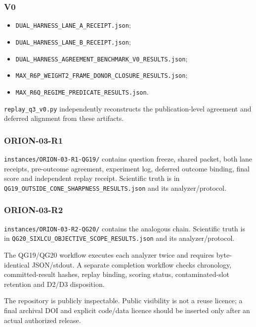 \documentclass[10pt]{article}
\providecommand{\tightlist}{%
  \setlength{\itemsep}{0pt}\setlength{\parskip}{0pt}}
\begin{document}
\hypertarget{v0}{%
\subsubsection{V0}\label{v0}}

\begin{itemize}
\tightlist
\item
  \texttt{DUAL\_HARNESS\_LANE\_A\_RECEIPT.json};
\item
  \texttt{DUAL\_HARNESS\_LANE\_B\_RECEIPT.json};
\item
  \texttt{DUAL\_HARNESS\_AGREEMENT\_BENCHMARK\_V0\_RESULTS.json};
\item
  \texttt{MAX\_R6P\_WEIGHT2\_FRAME\_DONOR\_CLOSURE\_RESULTS.json};
\item
  \texttt{MAX\_R6Q\_REGIME\_PREDICATE\_RESULTS.json}.
\end{itemize}

\texttt{replay\_q3\_v0.py} independently reconstructs the
publication-level agreement and deferred alignment from these artifacts.

\hypertarget{orion-03-r1}{%
\subsubsection{ORION-03-R1}\label{orion-03-r1}}

\texttt{instances/ORION-03-R1-QG19/} contains question freeze, shared
packet, both lane receipts, pre-outcome agreement, experiment log,
deferred outcome binding, final score and independent replay receipt.
Scientific truth is in
\texttt{QG19\_OUTSIDE\_CONE\_SHARPNESS\_RESULTS.json} and its
analyzer/protocol.

\hypertarget{orion-03-r2}{%
\subsubsection{ORION-03-R2}\label{orion-03-r2}}

\texttt{instances/ORION-03-R2-QG20/} contains the analogous chain.
Scientific truth is in
\texttt{QG20\_SIXLCU\_OBJECTIVE\_SCOPE\_RESULTS.json} and its
analyzer/protocol.

The QG19/QG20 workflow executes each analyzer twice and requires
byte-identical JSON/stdout. A separate completion workflow checks
chronology, committed-result hashes, replay binding, scoring status,
contaminated-slot retention and D2/D3 disposition.

The repository is publicly inspectable. Public visibility is not a reuse
licence; a final archival DOI and explicit code/data licence should be
inserted only after an actual authorized release.
\end{document}
